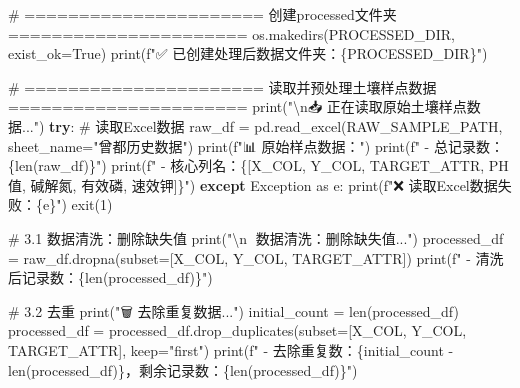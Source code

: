 \documentclass[
  letterpaper,
  DIV=11,
  numbers=noendperiod]{scrreprt}
\newenvironment{Shaded}{\begin{snugshade}}{\end{snugshade}}
\newcommand{\BuiltInTok}[1]{\textcolor[rgb]{0.00,0.23,0.31}{#1}}
\newcommand{\CharTok}[1]{\textcolor[rgb]{0.13,0.47,0.30}{#1}}
\newcommand{\CommentTok}[1]{\textcolor[rgb]{0.37,0.37,0.37}{#1}}
\newcommand{\ControlFlowTok}[1]{\textcolor[rgb]{0.00,0.23,0.31}{\textbf{#1}}}
\newcommand{\DecValTok}[1]{\textcolor[rgb]{0.68,0.00,0.00}{#1}}
\newcommand{\ImportTok}[1]{\textcolor[rgb]{0.00,0.46,0.62}{#1}}
\newcommand{\NormalTok}[1]{\textcolor[rgb]{0.00,0.23,0.31}{#1}}
\newcommand{\OperatorTok}[1]{\textcolor[rgb]{0.37,0.37,0.37}{#1}}
\newcommand{\PreprocessorTok}[1]{\textcolor[rgb]{0.68,0.00,0.00}{#1}}
\newcommand{\SpecialCharTok}[1]{\textcolor[rgb]{0.37,0.37,0.37}{#1}}
\newcommand{\SpecialStringTok}[1]{\textcolor[rgb]{0.13,0.47,0.30}{#1}}
\newcommand{\StringTok}[1]{\textcolor[rgb]{0.13,0.47,0.30}{#1}}
\newcommand{\VariableTok}[1]{\textcolor[rgb]{0.07,0.07,0.07}{#1}}
\begin{document}
\begin{Shaded}
\begin{Highlighting}[]
\CommentTok{\# ====================== 创建processed文件夹 ======================}
\NormalTok{os.makedirs(PROCESSED\_DIR, exist\_ok}\OperatorTok{=}\VariableTok{True}\NormalTok{)}
\BuiltInTok{print}\NormalTok{(}\SpecialStringTok{f"✅ 已创建处理后数据文件夹：}\SpecialCharTok{\{}\NormalTok{PROCESSED\_DIR}\SpecialCharTok{\}}\SpecialStringTok{"}\NormalTok{)}

\CommentTok{\# ====================== 读取并预处理土壤样点数据 ======================}
\BuiltInTok{print}\NormalTok{(}\StringTok{"}\CharTok{\textbackslash{}n}\StringTok{📥 正在读取原始土壤样点数据..."}\NormalTok{)}
\ControlFlowTok{try}\NormalTok{:}
    \CommentTok{\# 读取Excel数据}
\NormalTok{    raw\_df }\OperatorTok{=}\NormalTok{ pd.read\_excel(RAW\_SAMPLE\_PATH, sheet\_name}\OperatorTok{=}\StringTok{"曾都历史数据"}\NormalTok{)}
    \BuiltInTok{print}\NormalTok{(}\SpecialStringTok{f"📊 原始样点数据："}\NormalTok{)}
    \BuiltInTok{print}\NormalTok{(}\SpecialStringTok{f"   {-} 总记录数：}\SpecialCharTok{\{}\BuiltInTok{len}\NormalTok{(raw\_df)}\SpecialCharTok{\}}\SpecialStringTok{"}\NormalTok{)}
    \BuiltInTok{print}\NormalTok{(}\SpecialStringTok{f"   {-} 核心列名：}\SpecialCharTok{\{}\NormalTok{[X\_COL, Y\_COL, TARGET\_ATTR, }\StringTok{\textquotesingle{}PH值\textquotesingle{}}\NormalTok{, }\StringTok{\textquotesingle{}碱解氮\textquotesingle{}}\NormalTok{, }\StringTok{\textquotesingle{}有效磷\textquotesingle{}}\NormalTok{, }\StringTok{\textquotesingle{}速效钾\textquotesingle{}}\NormalTok{]}\SpecialCharTok{\}}\SpecialStringTok{"}\NormalTok{)}
\ControlFlowTok{except} \PreprocessorTok{Exception} \ImportTok{as}\NormalTok{ e:}
    \BuiltInTok{print}\NormalTok{(}\SpecialStringTok{f"❌ 读取Excel数据失败：}\SpecialCharTok{\{}\NormalTok{e}\SpecialCharTok{\}}\SpecialStringTok{"}\NormalTok{)}
\NormalTok{    exit(}\DecValTok{1}\NormalTok{)}

\CommentTok{\# 3.1 数据清洗：删除缺失值}
\BuiltInTok{print}\NormalTok{(}\StringTok{"}\CharTok{\textbackslash{}n}\StringTok{🧹 数据清洗：删除缺失值..."}\NormalTok{)}
\NormalTok{processed\_df }\OperatorTok{=}\NormalTok{ raw\_df.dropna(subset}\OperatorTok{=}\NormalTok{[X\_COL, Y\_COL, TARGET\_ATTR])}
\BuiltInTok{print}\NormalTok{(}\SpecialStringTok{f"   {-} 清洗后记录数：}\SpecialCharTok{\{}\BuiltInTok{len}\NormalTok{(processed\_df)}\SpecialCharTok{\}}\SpecialStringTok{"}\NormalTok{)}

\CommentTok{\# 3.2 去重}
\BuiltInTok{print}\NormalTok{(}\StringTok{"🗑️ 去除重复数据..."}\NormalTok{)}
\NormalTok{initial\_count }\OperatorTok{=} \BuiltInTok{len}\NormalTok{(processed\_df)}
\NormalTok{processed\_df }\OperatorTok{=}\NormalTok{ processed\_df.drop\_duplicates(subset}\OperatorTok{=}\NormalTok{[X\_COL, Y\_COL, TARGET\_ATTR], keep}\OperatorTok{=}\StringTok{"first"}\NormalTok{)}
\BuiltInTok{print}\NormalTok{(}\SpecialStringTok{f"   {-} 去除重复数：}\SpecialCharTok{\{}\NormalTok{initial\_count }\OperatorTok{{-}} \BuiltInTok{len}\NormalTok{(processed\_df)}\SpecialCharTok{\}}\SpecialStringTok{，剩余记录数：}\SpecialCharTok{\{}\BuiltInTok{len}\NormalTok{(processed\_df)}\SpecialCharTok{\}}\SpecialStringTok{"}\NormalTok{)}


\end{Highlighting}
\end{Shaded}
\end{document}
